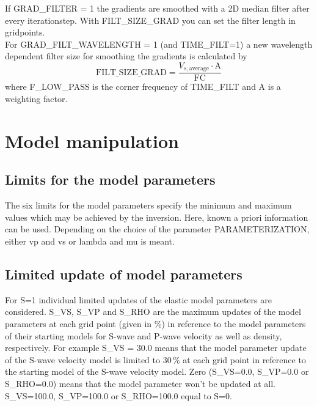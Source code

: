 If GRAD\_FILTER = 1 the gradients are smoothed with a 2D median filter after every iterationstep. With FILT\_SIZE\_GRAD you can set the filter length in gridpoints.\\
For GRAD\_FILT\_WAVELENGTH = 1 (and TIME\_FILT=1) a new wavelength dependent filter size for smoothing the gradients is calculated by
\begin{equation}
 \mbox{FILT\_SIZE\_GRAD} = \frac{V_{s,\text{average}}\cdot \text{A}}{\text{FC}}
\end{equation}
where F\_LOW\_PASS is the corner frequency of TIME\_FILT and A is a weighting factor.


\section{Model manipulation}
\subsection{Limits for the model parameters}
{\color{blue}{\begin{verbatim}
"Upper and lower limits for model parameters" : "comment",
			"VPUPPERLIM" : "3500",
			"VPLOWERLIM" : "0",
			"VSUPPERLIM" : "5000",
			"VSLOWERLIM" : "0",
			"RHOUPPERLIM" : "5000",
			"RHOLOWERLIM" : "0",
\end{verbatim}}}

{\color{red}{\begin{verbatim}
Default values are:
VPUPPERLIM=25000.0
VPLOWERLIM=0.0
VSUPPERLIM=25000.0
VSLOWERLIM=0.0
RHOUPPERLIM=25000.0
RHOLOWERLIM=0.0
\end{verbatim}}}

The six limits for the model parameters specify the minimum and maximum values which may be achieved by the inversion. Here, known a priori information can be used. Depending on the choice of the parameter PARAMETERIZATION, either vp and vs or lambda and mu is meant.

\subsection{Limited update of model parameters}
{\color{blue}{\begin{verbatim}
"Limited model update in reference to the starting model" : "comment",
"S" : "0",
"S_VS" : "0.0",
"S_VP" : "0.0",
"S_RHO" : "0.0",
\end{verbatim}}}
{\color{red}{\begin{verbatim}
Default values are:
	S=0
\end{verbatim}}}
For S=1 individual limited updates of the elastic model parameters are considered. S\_VS, S\_VP and S\_RHO are the maximum updates of the model parameters at each grid point (given in \%) in reference to the model parameters of their starting models for S-wave and P-wave velocity as well as density, respectively. For example S\_VS = 30.0 means that the model parameter update of the S-wave velocity model is limited to 30\,\% at each grid point in reference to the starting model of the S-wave velocity model. Zero (S\_VS=0.0, S\_VP=0.0 or S\_RHO=0.0) means that the model parameter won't be updated at all. S\_VS=100.0, S\_VP=100.0 or S\_RHO=100.0 equal to S=0.

